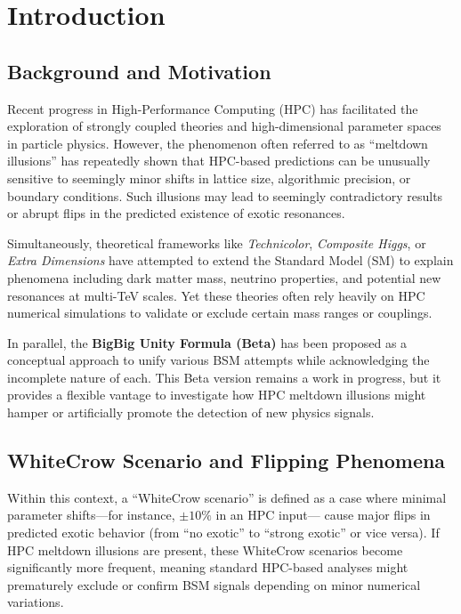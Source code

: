 \documentclass[11pt]{article}
\begin{document}
\section{Introduction}
\label{sec:intro}

\subsection{Background and Motivation}
Recent progress in High-Performance Computing (HPC) has facilitated 
the exploration of strongly coupled theories and high-dimensional parameter spaces 
in particle physics. However, the phenomenon often referred to as 
``meltdown illusions'' has repeatedly shown that HPC-based predictions 
can be unusually sensitive to seemingly minor shifts in lattice size, 
algorithmic precision, or boundary conditions. Such illusions 
may lead to seemingly contradictory results or abrupt flips 
in the predicted existence of exotic resonances.

Simultaneously, theoretical frameworks like \textit{Technicolor}, 
\textit{Composite Higgs}, or \textit{Extra Dimensions} 
have attempted to extend the Standard Model (SM) 
to explain phenomena including dark matter mass, neutrino properties, 
and potential new resonances at multi-TeV scales. 
Yet these theories often rely heavily on HPC numerical simulations 
to validate or exclude certain mass ranges or couplings.

In parallel, the \textbf{BigBig Unity Formula (Beta)} has been proposed 
as a conceptual approach to unify various BSM attempts while acknowledging 
the incomplete nature of each. This Beta version remains a work in progress, 
but it provides a flexible vantage to investigate how HPC meltdown illusions 
might hamper or artificially promote the detection of new physics signals.

\subsection{WhiteCrow Scenario and Flipping Phenomena}
Within this context, a ``WhiteCrow scenario'' is defined as a case 
where minimal parameter shifts---for instance, $\pm 10\%$ in an HPC input--- 
cause major flips in predicted exotic behavior (from ``no exotic'' to 
``strong exotic'' or vice versa). If HPC meltdown illusions are present, 
these WhiteCrow scenarios become significantly more frequent, 
meaning standard HPC-based analyses might prematurely exclude or confirm 
BSM signals depending on minor numerical variations.
\end{document}
